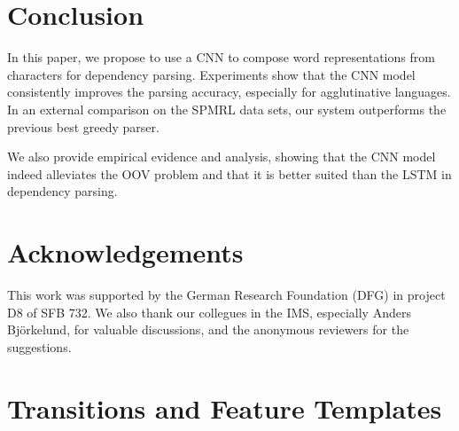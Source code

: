\documentclass[11pt,a4paper]{article}
\begin{document}
\section{Conclusion}
  In this paper, we propose to use a CNN to compose word representations from characters for dependency parsing. Experiments show that the CNN model consistently improves the parsing accuracy, especially for agglutinative languages. 
  In an external comparison on the SPMRL data sets, our system outperforms the previous best greedy parser.

  We also provide empirical evidence and analysis, showing that the CNN model indeed alleviates the OOV problem and that
  it is better suited than the LSTM in dependency parsing.

\section*{Acknowledgements}
  This work was supported by the German Research Foundation (DFG) in project D8 of SFB 732. We also thank our collegues in the IMS, especially Anders Bj\"orkelund, for valuable discussions, and the anonymous reviewers for the suggestions.


\FloatBarrier




\newpage
\appendix
\section{Transitions and Feature Templates}\label{sec:system}
\end{document}

